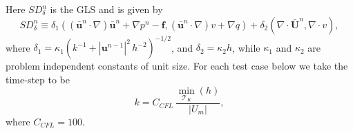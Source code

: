 Here $SD_{\delta}^n$ is the GLS and is given by
\begin{equation}
  SD_{\delta}^n \equiv
    \delta_1 (\left(\bar{\mathbf{u}}^n \cdot \nabla \right) \bar{\mathbf{u}}^n
        + \nabla p^n - \mathbf{f},
      \left(\bar{\mathbf{u}}^n \cdot \nabla \right) v + \nabla q)
      + \delta_2 (\nabla \cdot \bar{\mathbf{U}}^n, \nabla \cdot v),
  \label{eqn:NSEStabilization}
\end{equation}
where $\delta_1 = \kappa_1 (k^{-1} + |\mathbf{u}^{n-1}|^2\, h^{-2})^{-1/2}$, and
$\delta_2 = \kappa_2 h$, while $\kappa_1$ and $\kappa_2$ are problem independent
constants of unit size. For each test case below we take the time-step to be
\begin{equation*}
  k = C_{CFL}\, \frac{\min_{\mathcal{T}_K}(h)}{|U_m|},
\end{equation*}
where $C_{CFL}=100$.

